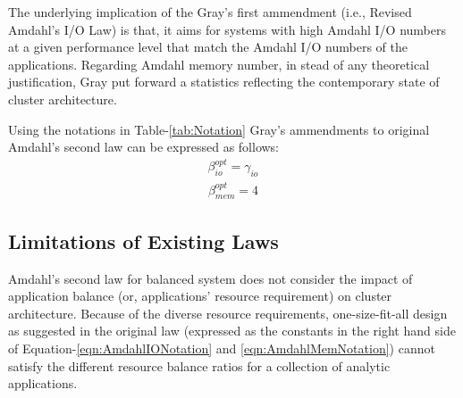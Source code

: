 \documentclass[journal]{IEEEtran}
\begin{document}
The underlying implication of the Gray's first ammendment (i.e., Revised Amdahl's I/O Law) is that, it aims for systems with high Amdahl I/O numbers at a given performance level that match the Amdahl I/O  numbers of the applications. Regarding Amdahl memory number, in stead of any theoretical justification, Gray put forward a statistics reflecting the contemporary state of cluster architecture. 

Using the notations in Table-\ref{tab:Notation} Gray's ammendments to original Amdahl's second law can be expressed as follows:
\begin{equation} \label{eqn:GrayIONotation}
\begin{split}
\beta_{io}^{opt} = \gamma_{io}
\end{split}
\end{equation}
\begin{equation} \label{eqn:GrayMemNotation}
\begin{split}
\beta_{mem}^{opt} = 4
\end{split}
\end{equation}

\subsection{Limitations of Existing Laws}
Amdahl's second law for balanced system does not consider the impact of application balance (or, applications' resource requirement) on cluster architecture. Because of the diverse resource requirements, one-size-fit-all design as suggested in the original law (expressed as the constants in the right hand side of Equation-\ref{eqn:AmdahlIONotation} and \ref{eqn:AmdahlMemNotation}) cannot satisfy the different resource balance ratios for a collection of analytic applications. 
\end{document}
